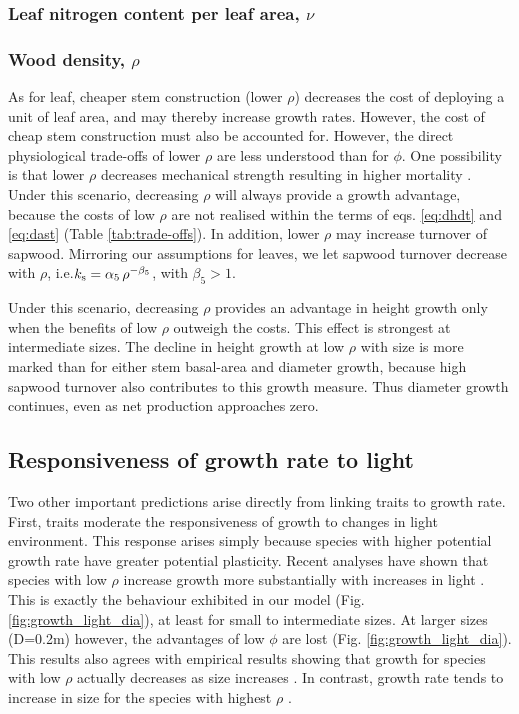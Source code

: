 \documentclass[a4paper,11pt]{article}
\begin{document}
\subsubsection{Leaf nitrogen content per leaf area, $\nu$}

\subsubsection{Wood density, $\rho$}

As for leaf, cheaper stem construction (lower $\rho$) decreases the cost of deploying a unit of leaf area, and may thereby increase growth rates. However, the cost of cheap stem construction must also be accounted for. However, the direct physiological trade-offs of lower $\rho$ are less understood than for $\phi$. One possibility is that lower $\rho$ decreases mechanical strength resulting in higher mortality \citep{Chave-2009, Wright-2010}. Under this scenario, decreasing $\rho$ will always provide a growth advantage, because the costs of low $\rho$ are not realised within the terms of eqs. \ref{eq:dhdt} and \ref{eq:dast} (Table \ref{tab:trade-offs}). In addition, lower $\rho$ may increase turnover of sapwood. Mirroring our assumptions for leaves, we let sapwood turnover decrease with $\rho$, i.e.$k_{\rm s}=\alpha_5 \, \rho^{-\beta_5}$, with $\beta_5 > 1$.

Under this scenario, decreasing $\rho$ provides an advantage in height growth only when the benefits of low $\rho$ outweigh the costs. This effect is strongest at intermediate sizes. The decline in height growth at low $\rho$ with size is more marked than for either stem basal-area and diameter growth, because high sapwood turnover also contributes to this growth measure. Thus diameter growth continues, even as net production approaches zero.


\subsection{Responsiveness of growth rate to light}

Two other important predictions arise directly from linking traits to growth rate. First, traits moderate the responsiveness of growth to changes in light environment. This response arises simply because species with higher potential growth rate have greater potential plasticity. Recent analyses have shown that species with low $\rho$ increase growth more substantially with increases in light \citep{Ruger-2012}. This is exactly the behaviour exhibited in our model (Fig. \ref{fig:growth_light_dia}), at least for small to intermediate sizes. At larger sizes (D=0.2m) however, the advantages of low $\phi$ are lost (Fig. \ref{fig:growth_light_dia}). This results also agrees with empirical results showing that growth for species with low $\rho$ actually decreases as size increases \citep{Ruger-2012}. In contrast, growth rate tends to increase in size for the species with highest $\rho$ \citep{Ruger-2012}.
\end{document}

